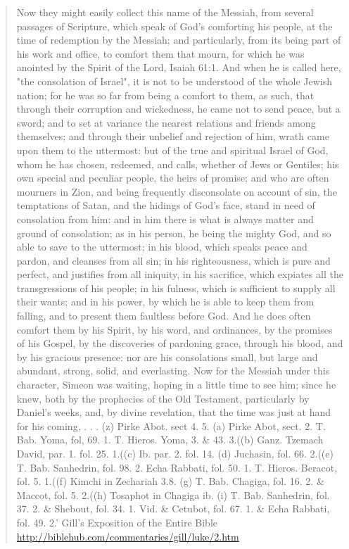 \documentclass[11pt]{article}
\begin{document}
\begin{quote}
Now they might easily collect this name of the Messiah, from several passages of Scripture, which speak of God's comforting his people, at the time of redemption by the Messiah; and particularly, from its being part of his work and office, to comfort them that mourn, for which he was anointed by the Spirit of the Lord, Isaiah 61:1. And when he is called here, "the consolation of Israel", it is not to be understood of the whole Jewish nation; for he was so far from being a comfort to them, as such, that through their corruption and wickedness, he came not to send peace, but a sword; and to set at variance the nearest relations and friends among themselves; and through their unbelief and rejection of him, wrath came upon them to the uttermost: but of the true and spiritual Israel of God, whom he has chosen, redeemed, and calls, whether of Jews or Gentiles; his own special and peculiar people, the heirs of promise; and who are often mourners in Zion, and being frequently disconsolate on account of sin, the temptations of Satan, and the hidings of God's face, stand in need of consolation from him: and in him there is what is always matter and ground of consolation; as in his person, he being the mighty God, and so able to save to the uttermost; in his blood, which speaks peace and pardon, and cleanses from all sin; in his righteousness, which is pure and perfect, and justifies from all iniquity, in his sacrifice, which expiates all the transgressions of his people; in his fulness, which is sufficient to supply all their wants; and in his power, by which he is able to keep them from falling, and to present them faultless before God. And he does often comfort them by his Spirit, by his word, and ordinances, by the promises of his Gospel, by the discoveries of pardoning grace, through his blood, and by his gracious presence: nor are his consolations small, but large and abundant, strong, solid, and everlasting. Now for the Messiah under this character, Simeon was waiting, hoping in a little time to see him; since he knew, both by the prophecies of the Old Testament, particularly by Daniel's weeks, and, by divine revelation, that the time was just at hand for his coming,
. . .
(z) Pirke Abot. sect 4. 5. (a) Pirke Abot, sect. 2. T. Bab. Yoma, fol, 69. 1. T. Hieros. Yoma, 3. \& 43. 3.((b) Ganz. Tzemach David, par. 1. fol. 25. 1.((c) Ib. par. 2. fol. 14. (d) Juchasin, fol. 66. 2.((e) T. Bab. Sanhedrin, fol. 98. 2. Echa Rabbati, fol. 50. 1. T. Hieros. Beracot, fol. 5. 1.((f) Kimchi in Zechariah 3.8. (g) T. Bab. Chagiga, fol. 16. 2. \& Maccot, fol. 5. 2.((h) Tosaphot in Chagiga ib. (i) T. Bab. Sanhedrin, fol. 37. 2. \& Shebout, fol. 34. 1. Vid. \& Cetubot, fol. 67. 1. \& Echa Rabbati, fol. 49. 2.'\newline
Gill's Exposition of the Entire Bible\newline
\url{http://biblehub.com/commentaries/gill/luke/2.htm}
\newline


\end{quote}
\end{document}
